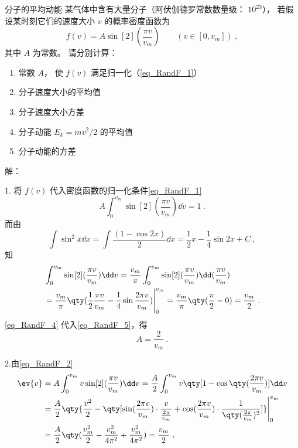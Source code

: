 \begin{example}{分子的平均动能}\label{ex_RandF_1}
某气体中含有大量分子（阿伏伽德罗常数数量级： $10^{23}$）， 若假设某时刻它们的速度大小 $v$ 的概率密度函数为
\begin{equation}
f(v) = A \sin[2](\frac{\pi v}{v_{m}}) \qquad (v \in [0, v_{m}])~,
\end{equation}
其中 $A$ 为常数。 请分别计算：
\begin{enumerate}
\item 常数 $A$， 使 $f(v)$ 满足归一化（\autoref{eq_RandF_1}）
\item 分子速度大小的平均值
\item 分子速度大小方差
\item 分子动能 $E_k = mv^2/2$ 的平均值
\item 分子动能的方差
\end{enumerate}

解：

1. 将 $f(v)$ 代入密度函数的归一化条件\autoref{eq_RandF_1} 
\begin{equation}\label{eq_RandF_5}
A\int_{0}^{v_{m}} \sin[2](\frac{\pi v}{v_{m}})\dd v= 1~.
\end{equation}
而由
\begin{equation}
\int \sin^2 x\dd x = \int\frac{(1-\cos 2x)}{2}\dd x = \frac{1}{2}x-\frac{1}{4}\sin 2x+C~,
\end{equation}
知
\begin{equation}\label{eq_RandF_4}
\begin{aligned}
&\int_{0}^{v_{m}} \sin[2](\frac{\pi v}{v_{m}})\dd v=\frac{v_{m}}{\pi}\int_{0}^{v_{m}} \sin[2](\frac{\pi v}{v_{m}})\dd (\frac{\pi v}{v_{m}})\\
&=\frac{v_{m}}{\pi}\qty (\frac{1}{2}\frac{\pi v}{v_{m}}-\frac{1}{4}\sin \frac{2\pi v}{v_{m}})\Bigg|_{0}^{v_{m}}=\frac{v_{m}}{\pi}\qty(\frac{\pi}{2}-0)=\frac{v_{m}}{2}~.
\end{aligned}
\end{equation}
\autoref{eq_RandF_4} 代入\autoref{eq_RandF_5}，得 
\begin{equation}
A=\frac{2}{v_{m}}~.
\end{equation}

2.由\autoref{eq_RandF_2} 
\begin{equation}\label{eq_RandF_8}
\begin{aligned}
\ev{v}&=A\int_{0}^{v_{m}} v\sin[2](\frac{\pi v}{v_{m}})\dd v=\frac{A}{2}\int_0^{v_m}v\qty[1-\cos\qty(\frac{2\pi v}{v_{m}})]\dd v\\
&=\frac{A}{2}\qty{\frac{v^2}{2}-\qty[\sin(\frac{2\pi v}{v_{m}})\cdot\frac{v}{\frac{2\pi}{v_m}}+\cos(\frac{2\pi v}{v_{m}})\cdot\frac{1}{\qty(\frac{2\pi}{v_m})^2}]}\Bigg|_{0}^{v_{m}}\\
&=\frac{A}{2}\qty(\frac{v_{m}^2}{2}-\frac{v_{m}^2}{4\pi^2}+\frac{v_{m}^2}{4\pi^2})=\frac{v_{m}}{2}~.
\end{aligned}
\end{equation}


\end{example}
